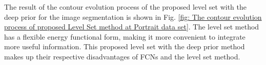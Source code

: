 The result of the contour evolution process of the proposed level set with the deep prior for the image segmentation is shown in Fig. \ref{fig: The contour evolution process of proposed Level Set method at Portrait data set}. The level set method has a flexible energy functional form, making it more convenient to integrate more useful information. This proposed level set with the deep prior method makes up their respective disadvantages of FCNs and the level set method.
